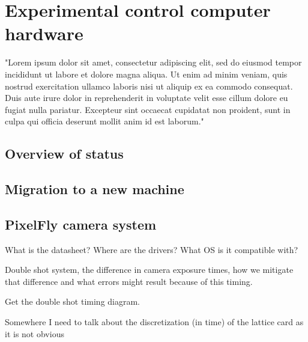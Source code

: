 \chapter{Experimental control computer hardware}
"Lorem ipsum dolor sit amet, consectetur adipiscing elit, sed do eiusmod tempor incididunt ut labore et dolore magna aliqua. Ut enim ad minim veniam, quis nostrud exercitation ullamco laboris nisi ut aliquip ex ea commodo consequat. Duis aute irure dolor in reprehenderit in voluptate velit esse cillum dolore eu fugiat nulla pariatur. Excepteur sint occaecat cupidatat non proident, sunt in culpa qui officia deserunt mollit anim id est laborum."

\section{Overview of status}

\section{Migration to a new machine}

\section{PixelFly camera system}

What is the datasheet?
Where are the drivers?
What OS is it compatible with?

Double shot system, the difference in camera exposure times, how we mitigate that difference and what errors might result because of this timing.

Get the double shot timing diagram.

Somewhere I need to talk about the discretization (in time) of the lattice card as it is not obvious